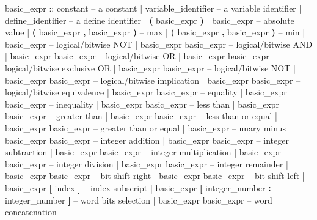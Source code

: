 \begin{Grammar}
basic_expr ::
       constant                  \footnotesize{-- a constant}
      | variable_identifier          \footnotesize{-- a variable identifier}
      | define_identifier            \footnotesize{-- a define identifier}
      | \textbf{(} basic_expr \textbf{)}
      |  basic\_expr               -- absolute value
      |  \textbf{(} basic\_expr \textbf{,} basic\_expr \textbf{)} -- max
      |  \textbf{(} basic\_expr \textbf{,} basic\_expr \textbf{)} -- min
      | \operator{!} basic_expr              \footnotesize{-- logical/bitwise NOT}
      | basic_expr \operator{\&} basic_expr    \footnotesize{-- logical/bitwise AND}
      | basic_expr \operator{|} basic_expr    \footnotesize{-- logical/bitwise OR}
      | basic_expr  basic_expr  \footnotesize{-- logical/bitwise exclusive OR}
      | basic_expr  basic_expr \footnotesize{-- logical/bitwise NOT }
      | basic_expr \operator{->} basic_expr   \footnotesize{-- logical/bitwise implication}
      | basic_expr \operator{<->} basic_expr  \footnotesize{-- logical/bitwise equivalence}
      | basic_expr \operator{=} basic_expr    \footnotesize{-- equality}
      | basic_expr \operator{!=} basic_expr   \footnotesize{-- inequality}
      | basic_expr \operator{<} basic_expr    \footnotesize{-- less than}
      | basic_expr \operator{>} basic_expr    \footnotesize{-- greater than}
      | basic_expr \operator{<=} basic_expr   \footnotesize{-- less than or equal}
      | basic_expr \operator{>=} basic_expr   \footnotesize{-- greater than or equal}
      | \operator{-} basic_expr              \footnotesize{-- unary minus}
      | basic_expr \operator{+} basic_expr    \footnotesize{-- integer addition}
      | basic_expr \operator{-} basic_expr    \footnotesize{-- integer subtraction}
      | basic_expr \operator{*} basic_expr    \footnotesize{-- integer multiplication}
      | basic_expr \operator{/} basic_expr    \footnotesize{-- integer division}
      | basic_expr  basic_expr  \footnotesize{-- integer remainder}
      | basic_expr \operator{>>} basic_expr   \footnotesize{-- bit shift right}
      | basic_expr \operator{<<} basic_expr   \footnotesize{-- bit shift left}
      | basic_expr \textbf{[} index \textbf{]}         -- index subscript
      | basic_expr \textbf{[} integer_number \textbf{:} integer_number \textbf{]}
                                     \footnotesize{-- word bits selection}
      | basic_expr \operator{::} basic_expr   \footnotesize{-- word concatenation}

\end{Grammar}
